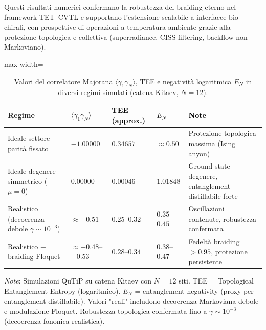 \documentclass[11pt,a4paper]{article}
\theoremstyle{plain}
\theoremstyle{definition}
\begin{document}
Questi risultati numerici confermano la robustezza del braiding eterno nel framework TET–CVTL e supportano l'estensione scalabile a interfacce bio-chirali, con prospettive di operazioni a temperatura ambiente grazie alla protezione topologica e collettiva (superradiance, CISS filtering, backflow non-Markoviano).




\setlength{\tabcolsep}{3pt}  %
\begin{table}[H]
\centering
\caption{Valori del correlatore Majorana $\langle \gamma_1 \gamma_N \rangle$, TEE e negatività logaritmica $E_N$ in diversi regimi simulati (catena Kitaev, $N=12$).}
\label{tab:majorana_tee_en_summary}
\small
\arrayrulewidth=0.8pt

\begin{adjustbox}{max width=\textwidth}
\begin{tabularx}{\textwidth}{
  | >{\raggedright\arraybackslash}p{5.2cm}   %
  | >{\centering\arraybackslash}X             %
  | >{\centering\arraybackslash}X             %
  | >{\centering\arraybackslash}X             %
  | >{\raggedright\arraybackslash}p{5.0cm} | %
}
\hline
\rowcolor{cyan!20}
\textbf{Regime} & \textcolor{black}{\textbf{$\langle \gamma_1 \gamma_N \rangle$}} & \textcolor{black}{\textbf{TEE (approx.)}} & \textcolor{black}{\textbf{$E_N$}} & \textcolor{black}{\textbf{Note}} \\
\hline
Ideale settore parità fissato & $-1.00000$ & $0.34657$ & $\approx 0.50$ & Protezione topologica massima (Ising anyon) \\
\hline
Ideale degenere simmetrico ($\mu=0$) & $0.00000$ & $0.00046$ & $1.01848$ & Ground state degenere, entanglement distillabile forte \\
\hline
Realistico (decoerenza debole $\gamma \sim 10^{-3}$) & $\approx -0.51$ & $0.25$--$0.32$ & $0.35$--$0.45$ & Oscillazioni contenute, robustezza confermata \\
\hline
Realistico + braiding Floquet & $\approx -0.48$--$-0.53$ & $0.28$--$0.34$ & $0.38$--$0.47$ & Fedeltà braiding $>0.95$, protezione persistente \\
\hline
\end{tabularx}
\end{adjustbox}
\vspace{0.8em}

\vspace{0.3cm}

{\normalsize
\textit{Note}: Simulazioni QuTiP su catena Kitaev con $N=12$ siti. TEE = Topological Entanglement Entropy (logaritmico). $E_N$ = entanglement negativity (proxy per entanglement distillabile). Valori "reali" includono decoerenza Markoviana debole e modulazione Floquet. Robustezza topologica confermata fino a $\gamma \sim 10^{-3}$ (decoerenza fononica realistica).
}
\end{table}
\end{document}
